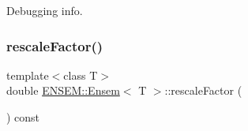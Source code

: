 Debugging info. 

\mbox{\label{classENSEM_1_1Ensem_aecf90199daafa73454e9c1aceef313a4}} 
\subsubsection{\texorpdfstring{rescaleFactor()}{rescaleFactor()}\hspace{0.1cm}{\footnotesize\ttfamily [1/2]}}
{\footnotesize\ttfamily template$<$class T$>$ \\
double \mbox{\hyperlink{classENSEM_1_1Ensem}{E\+N\+S\+E\+M\+::\+Ensem}}$<$ T $>$\+::rescale\+Factor (\begin{DoxyParamCaption}{ }\end{DoxyParamCaption}) const\hspace{0.3cm}{\ttfamily [inline]}}

